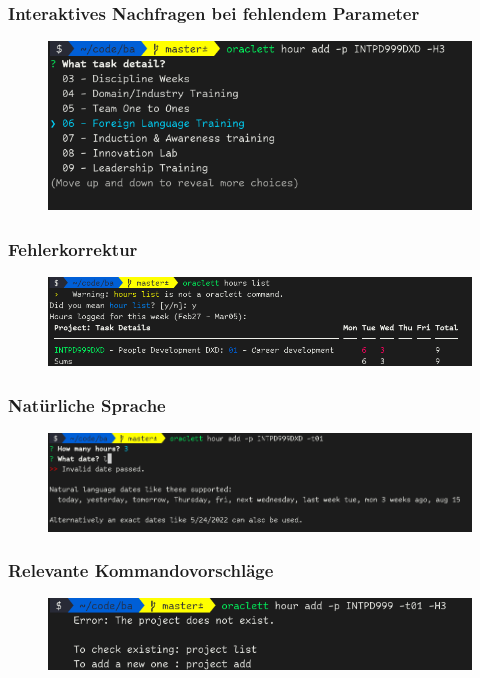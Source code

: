 \documentclass{beamer}
\begin{document}
\begin{frame}
  \frametitle{Interaktives Nachfragen bei fehlendem Parameter}

  \begin{figure}[H]
    \centering
    \includegraphics[scale=0.5]{demo-interactive-question.png}
  \end{figure}
\end{frame}

\begin{frame}
  \frametitle{Fehlerkorrektur}

  \begin{figure}[H]
    \centering
    \includegraphics[scale=0.38]{demo-error-correction.png}
  \end{figure}
\end{frame}

\begin{frame}
  \frametitle{Natürliche Sprache}

  \begin{figure}[H]
    \centering
    \includegraphics[scale=0.31]{demo-natural-lang.png}
  \end{figure}
\end{frame}

\begin{frame}
  \frametitle{Relevante Kommandovorschläge}

  \begin{figure}[H]
    \centering
    \includegraphics[scale=0.48]{demo-command-recommendations.png}
  \end{figure}
\end{frame}
\end{document}
